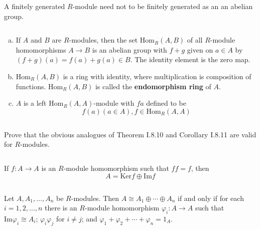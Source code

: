 $$ $$

\begin{ex}
    A finitely generated $R$-module need not to be finitely generated as an an abelian group.
\end{ex}

$$ $$

\begin{ex}
    \begin{enumerate}[(a)]
        \item If $A$ and $B$ are $R$-modules, then the set $\mathrm{Hom}_{R}(A,B)$ of all $R$-module homomorphisms $A\to B$ is an abelian group with $f+g$ given on $a\in A$ by $(f+g)(a)=f(a)+g(a)\in B$. The identity element is the zero map.
        \item $\mathrm{Hom}_{R}(A,B)$ is a ring with identity, where multiplication is composition of functions. $\mathrm{Hom}_{R}(A,B)$ is called the \textbf{endomorphism ring} of $A$.
        \item $A$ is a left $\mathrm{Hom}_{R}(A,A)$-module with $fa$ defined to be \[f(a)(a\in A), f\in \mathrm{Hom}_{R}(A,A)\]
    \end{enumerate}
\end{ex}

$$ $$

\begin{ex}
    Prove that the obvious analogues of Theorem I.8.10 and Corollary I.8.11 are valid for $R$-modules.
\end{ex}

$$ $$

\begin{ex}
    If $f:A\to A$ is an $R$-module homomorphism such that $ff=f$, then \[A=\mathrm{Ker}f\oplus\mathrm{Im}f\]
\end{ex}

$$ $$

\begin{ex}
    Let $A,A_{1},\dots, A_{n}$ be $R$-modules. Then $A\cong A_{1}\oplus\cdots\oplus A_{n}$ if and only if for each $i=1,2,\dots,n$ there is an $R$-module homomorphism $\varphi_{i}:A\to A$ such that $\mathrm{Im}\varphi_{i}\cong A_{i}$; $\varphi_{i}\varphi_{j}$ for $i\neq j$; and $\varphi_{1}+\varphi_{2}+\cdots+\varphi_{n}=1_{A}$.
\end{ex}

$$ $$

